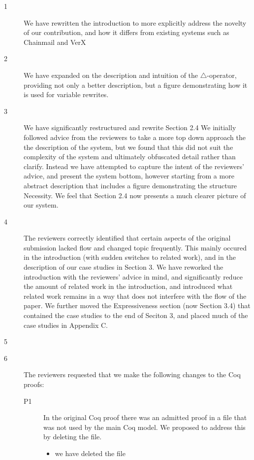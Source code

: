 \documentclass[11pt]{amsart}
\newcommand{\ponders}[3]{\marginpar{\tiny\itshape\raggedright\textcolor{#2}{\textbf{#1:} #3}}\ignorespaces}
\newcommand{\jm}[2][]{\ponders{Julian}{magenta}{#1} \textcolor{magenta}{#2}\xspace}
\begin{document}
  \begin{description}
  	\item[1] 
  	We have rewritten the introduction to more explicitly 
  	address the novelty of our contribution, and how it differs from
  	existing systems such as Chainmail and VerX
  	
  	\item[2]
  	We have expanded on the description and intuition of the 
  	$\triangle$-operator, providing not only a better description, but
  	a figure demonstrating how it is used for variable rewrites.
  	
  	\item[3]
  	We have significantly restructured and rewrite Section 2.4
  	We initially followed advice from the reviewers to take a more
  	top down approach the the description of the system, but we 
  	found that this did not suit the complexity of the system
  	and ultimately obfuscated detail rather than clarify. Instead 
  	we have attempted to capture the intent of the reviewers' 
  	advice, and present the system bottom, however starting from 
  	a more abstract description that includes a figure demonstrating 
  	the structure Necessity.
  	We feel that Section 2.4 now presents a much clearer picture of our
  	system.
  	
  	\item[4] The reviewers correctly identified that certain
  	aspects of the original submission lacked flow and changed 
  	topic frequently. This mainly occured in the introduction 
  	(with sudden switches to related work), and in the description
  	of our case studies in Section 3. We have reworked the introduction
  	with the reviewers' advice in mind, and significantly reduce the 
  	amount of related work in the introduction, and introduced what 
  	related work remains in a way that does not interfere with the flow 
  	of the paper. We further moved the Expressiveness section (now Section 3.4) that 
  	contained the case studies to the end of Seciton 3, and placed 
  	much of the case studies in Appendix C.
  	
  	\item[5] \jm[not sure what exactly to put here]{}
  	
  	\item[6]


The reviewers requested that we make the following changes to the Coq proofs:

\begin{description}
\item[P1] 
In the original Coq proof there was an admitted proof in a file that was 
not used by the main Coq model.
We proposed to address this by deleting the file.
\begin{itemize}
\item we have deleted the file
\end{itemize}


\end{description}
\end{description}
\end{document}

